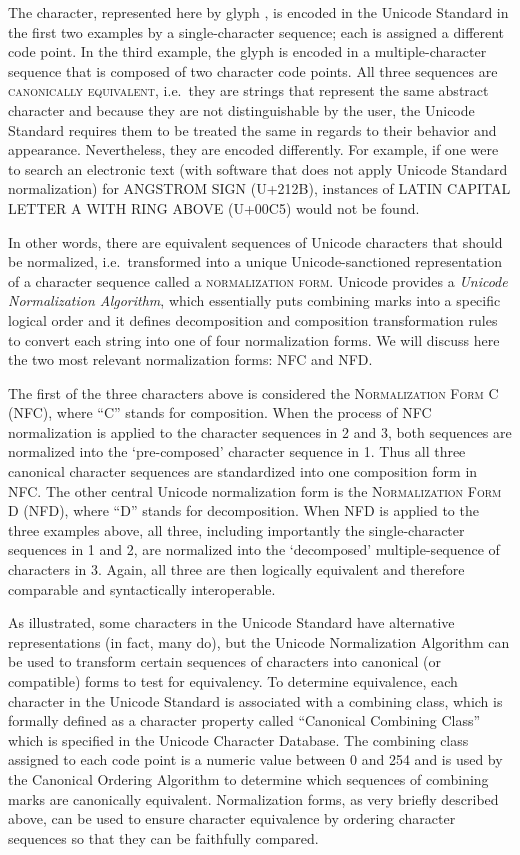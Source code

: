 The character, represented here by glyph , is encoded in the Unicode Standard in the first two examples by a single-character sequence; each is assigned a different code point. In the third example, the glyph is encoded in a multiple-character sequence that is composed of two character code points. All three sequences are \textsc{canonically equivalent}, i.e.~they are strings that represent the same abstract character and because they are not distinguishable by the user, the Unicode Standard requires them to be treated the same in regards to their behavior and appearance. Nevertheless, they are encoded differently. For example, if one were to search an electronic text (with software that does not apply Unicode Standard normalization) for ANGSTROM SIGN (U+212B), instances of LATIN CAPITAL LETTER A WITH RING ABOVE (U+00C5) would not be found.

In other words, there are equivalent sequences of Unicode characters that should be normalized, i.e.~transformed into a unique Unicode-sanctioned representation of a character sequence called a \textsc{normalization form}. Unicode provides a \emph{Unicode Normalization Algorithm}, which essentially puts combining marks into a specific logical order and it defines decomposition and composition transformation rules to convert each string into one of four normalization forms. We will discuss here the two most relevant normalization forms: NFC and NFD.

The first of the three characters above is considered the \textsc{Normalization Form C (NFC)}, where ``C'' stands for composition. When the process of NFC normalization is applied to the character sequences in 2 and 3, both sequences are normalized into the `pre-composed' character sequence in 1. Thus all three canonical character sequences are standardized into one composition form in NFC. The other central Unicode normalization form is the \textsc{Normalization Form D (NFD)}, where ``D'' stands for decomposition. When NFD is applied to the three examples above, all three, including importantly the single-character sequences in 1 and 2, are normalized into the `decomposed' multiple-sequence of characters in 3. Again, all three are then logically equivalent and therefore comparable and syntactically interoperable.

As illustrated, some characters in the Unicode Standard have alternative representations (in fact, many do), but the Unicode Normalization Algorithm can be used to transform certain sequences of characters into canonical (or compatible) forms to test for equivalency. To determine equivalence, each character in the Unicode Standard is associated with a combining class, which is formally defined as a character property called ``Canonical Combining Class'' which is specified in the Unicode Character Database. The combining class assigned to each code point is a numeric value between 0 and 254 and is used by the Canonical Ordering Algorithm to determine which sequences of combining marks are canonically equivalent. Normalization forms, as very briefly described above, can be used to ensure character equivalence by ordering character sequences so that they can be faithfully compared.

